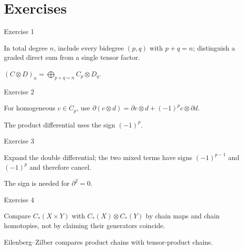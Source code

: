 \section{Exercises}

\begin{exercise}\label{exr:viii27-01}
Exercise 1
\end{exercise}
\begin{hint}
In total degree \(n\), include every bidegree \((p,q)\) with \(p+q=n\); distinguish a graded direct sum from a single tensor factor.
\end{hint}
\begin{solution}
\((C\otimes D)_n=\bigoplus_{p+q=n}C_p\otimes D_q\).
\end{solution}

\begin{exercise}\label{exr:viii27-02}
Exercise 2
\end{exercise}
\begin{hint}
For homogeneous \(c\in C_p\), use \(\partial(c\otimes d)=\partial c\otimes d+(-1)^p c\otimes\partial d\).
\end{hint}
\begin{solution}
The product differential uses the sign \((-1)^p\).
\end{solution}

\begin{exercise}\label{exr:viii27-03}
Exercise 3
\end{exercise}
\begin{hint}
Expand the double differential; the two mixed terms have signs \((-1)^{p-1}\) and \((-1)^p\) and therefore cancel.
\end{hint}
\begin{solution}
The sign is needed for \(\partial^2=0\).
\end{solution}

\begin{exercise}\label{exr:viii27-04}
Exercise 4
\end{exercise}
\begin{hint}
Compare \(C_*(X\times Y)\) with \(C_*(X)\otimes C_*(Y)\) by chain maps and chain homotopies, not by claiming their generators coincide.
\end{hint}
\begin{solution}
Eilenberg--Zilber compares product chains with tensor-product chains.
\end{solution}

